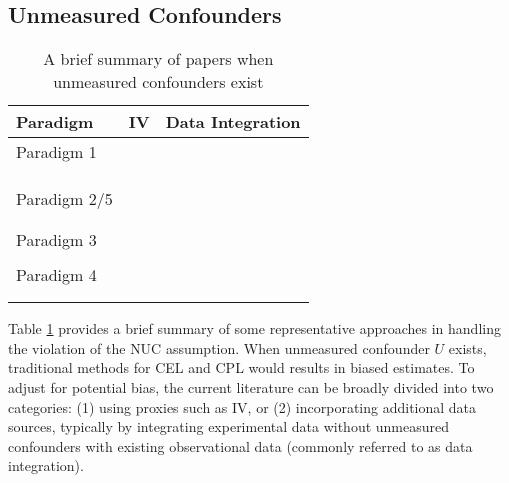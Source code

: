 \subsection{Unmeasured Confounders}
\begin{table}[tbh]
\centering\renewcommand{}
\begin{tabular}{l|ll}
\hline
Paradigm & \acrlong{IV} & Data Integration \\ 
\hline
Paradigm 1    &      \makecell{\cite{angrist1996identification}\\
\cite{wang2018bounded}\\ \cite{qiu2021optimal}\\
\cite{cui2021semiparametric}} & \cite{wu2022integrative}     \\
\hline
Paradigm 2/5    &     \makecell{\cite{li2021causal, fu2022offline}\\
\cite{xu2023instrumental}} & \makecell{\cite{gasse2021causal}\\
\cite{imbens2022long} }
\\
\hline
Paradigm 3         &        \makecell{\cite{chen2023estimating}\\
\cite{xu2023instrumental}} &  \cite{athey2020combining}        \\
\hline
Paradigm 4   &       \cite{kallus2018instrument} &\makecell{\cite{bareinboim2015bandits}\\
\cite{sen2017contextual}\\
\cite{xu2021deep}}
\\ 
\hline
\end{tabular}
\caption{A brief summary of papers when unmeasured confounders exist}\label{table:1}
\end{table}

Table \ref{table:1} provides a brief summary of some representative approaches in handling the violation of the \acrshort{NUC} assumption. 
When unmeasured confounder $U$ exists, traditional methods for \acrshort{CEL} and \acrshort{CPL} %
would results in biased estimates. To adjust for potential bias, the current literature can be broadly divided into two categories: (1) using proxies such as \acrfull{IV}, or (2) incorporating additional data sources, typically by integrating experimental data without unmeasured confounders with existing observational data (commonly referred to as data integration).

